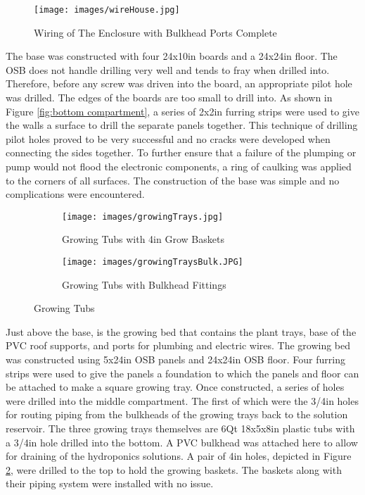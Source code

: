 \documentclass[12pt]{article} %
\begin{document}
\begin{figure}[H]
    \centering
    \texttt{[image: images/wireHouse.jpg]}
    \caption{Wiring of The Enclosure with Bulkhead Ports Complete}
    \label{fig:top housing}
\end{figure}

\noindent The base was constructed with four 24x10in boards and a 24x24in floor. The OSB does not handle drilling very well and tends to fray when drilled into. Therefore, before any screw was driven into the board, an appropriate pilot hole was drilled. The edges of the boards are too small to drill into. As shown in Figure \ref{fig:bottom compartment}, a series of 2x2in furring strips were used to give the walls a surface to drill the separate panels together. This technique of drilling pilot holes proved to be very successful and no cracks were developed when connecting the sides together. To further ensure that a failure of the plumping or pump would not flood the electronic components, a ring of caulking was applied to the corners of all surfaces. The construction of the base was simple and no complications were encountered. 


\begin{figure}[H]
    \centering
    \begin{subfigure}[b]{0.5\textwidth}
        \centering
        \texttt{[image: images/growingTrays.jpg]}
        \caption{Growing Tubs with 4in Grow Baskets}
        \label{fig:tubGrowbaskets}
    \end{subfigure}
    \begin{subfigure}[b]{0.45\textwidth}
        \centering
        \texttt{[image: images/growingTraysBulk.JPG]}
        \caption{Growing Tubs with Bulkhead Fittings}
        \label{fig:tubBulk}
    \end{subfigure}
    \caption{Growing Tubs}
    \label{fig:renderings}
\end{figure}

\pagebreak
\noindent Just above the base, is the growing bed that contains the plant trays, base of the PVC roof supports, and ports for plumbing and electric wires. The growing bed was constructed using 5x24in OSB panels and 24x24in OSB floor. Four furring strips were used to give the panels a foundation to which the panels and floor can be attached to make a square growing tray. Once constructed, a series of holes were drilled into the middle compartment. The first of which were the 3/4in holes for routing piping from the bulkheads of the growing trays back to the solution reservoir. The three growing trays themselves are 6Qt 18x5x8in plastic tubs with a 3/4in hole drilled into the bottom. A PVC bulkhead was attached here to allow for draining of the hydroponics solutions. A pair of 4in holes, depicted in Figure \ref{fig:tubGrowbaskets}, were drilled to the top to hold the growing baskets. The baskets along with their piping system were installed with no issue. 
\end{document}
